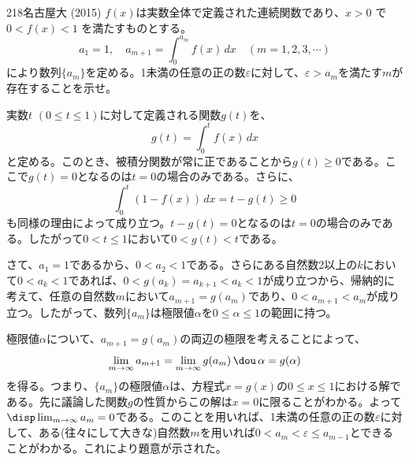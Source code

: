 \begin{prob}{218}{}{名古屋大 (2015)}
 $f(x)$は実数全体で定義された連続関数であり、$x>0$ で $0<f(x)<1$ を満たすものとする。
 \[ a_1=1,\quad a_{m+1}=\int_0^{a_m}\! f(x) \,dx \quad (m=1, 2, 3, \cdots) \]
 により数列$\{a_m\}$を定める。1未満の任意の正の数$\varepsilon$に対して、$\varepsilon>a_m$を満たす$m$が存在することを示せ。
\end{prob}

実数$t$ $(0\le t \le 1)$に対して定義される関数$g(t)$を、
\[ g(t) = \int_0^t\! f(x) \,dx \]
と定める。このとき、被積分関数が常に正であることから$g(t)\ge0$である。ここで$g(t)=0$となるのは$t=0$の場合のみである。さらに、
\[ \int_0^t\! \left(1-f(x)\right) \,dx = t-g(t) \ge0 \]
も同様の理由によって成り立つ。$t-g(t)=0$となるのは$t=0$の場合のみである。したがって$0 < t \le1$において$0<g(t)<t$である。

さて、$a_1=1$であるから、$0<a_2<1$である。さらにある自然数2以上の$k$において$0<a_k<1$であれば、$0<g(a_k)=a_{k+1}<a_k<1$が成り立つから、帰納的に考えて、任意の自然数$m$において$a_{m+1}=g(a_m)$であり、$0<a_{m+1}<a_m$が成り立つ。したがって、数列$\{a_m\}$は極限値$\alpha$を$0\le\alpha\le1$の範囲に持つ。

極限値$\alpha$について、$a_{m+1}=g(a_m)$の両辺の極限を考えることによって、
\[ \lim_{m\to\infty} a_{m+1}=\lim_{m\to\infty} g(a_m) \,\dou\, \alpha=g(\alpha) \]
を得る。つまり、$\{a_m\}$の極限値$\alpha$は、方程式$x=g(x)$の$0\le x\le 1$における解である。先に議論した関数$g$の性質からこの解は$x=0$に限ることがわかる。よって$\disp \lim_{m\to\infty} a_m=0$である。このことを用いれば、1未満の任意の正の数$\varepsilon$に対して、ある(往々にして大きな)自然数$m$を用いれば$0<a_m<\varepsilon\le a_{m-1}$とできることがわかる。これにより題意が示された。

